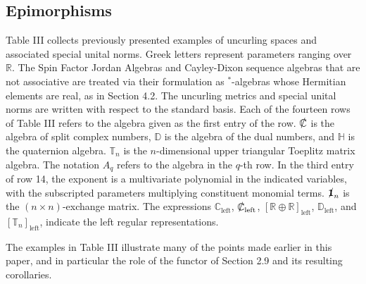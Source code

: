 \documentclass{amsart}
\numberwithin{equation}{section}
\theoremstyle{definition}
\numberwithin{theorem}{section}
\begin{document}
\subsection{Epimorphisms} Table III collects previously presented examples of uncurling spaces and associated special unital norms.  Greek letters represent parameters ranging over $\mathbb{R}$.  The Spin Factor Jordan Algebras and Cayley-Dixon sequence algebras that are not associative are treated via their formulation as \mbox{$^*$-algebras} whose Hermitian elements are real, as in Section 4.2. The uncurling metrics and special unital norms are written with respect to the standard basis.  Each of the fourteen rows of Table III refers to the algebra given as the first entry of the row.  $\slashed{\mathbb{C}}$ is the algebra of split complex numbers, $\mathbb{D}$ is the algebra of the dual numbers, and $\mathbb{H}$ is the quaternion algebra.  $\mathbb{T}_n$ is the $n$-dimensional upper triangular Toeplitz matrix algebra.  The notation $A_q$ refers to the algebra in the $q$-th row.  In the third entry of row 14, the exponent is a multivariate polynomial in the indicated variables, with the subscripted parameters multiplying constituent monomial terms.  $\slashed{\mathbf{1}}_n$ is the $(n\times n)$-exchange matrix.  The expressions $\mathbb{C}_\text{left}$, $\slashed{\mathbb{C}}_\text{left}$, $[\mathbb{R}\oplus\mathbb{R}]_\text{left}$, $\mathbb{D}_\text{left}$, and $[\mathbb{T}_n]_\text{left}$, indicate the left regular representations.  


\bigskip

The examples in Table III illustrate many of the points made earlier in this paper, and in particular the role of the functor of Section 2.9 and its resulting corollaries.    
 
\end{document}
